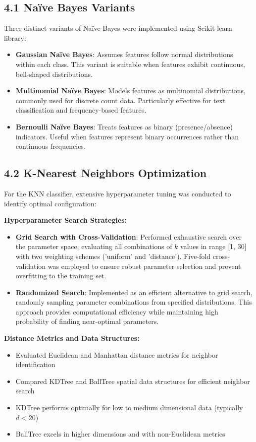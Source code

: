 \documentclass[11pt]{article}
\begin{document}
\subsection*{4.1 Na\"ive Bayes Variants}
Three distinct variants of Na\"ive Bayes were implemented using Scikit-learn library:
\begin{itemize}
    \item \textbf{Gaussian Na\"ive Bayes}: Assumes features follow normal distributions within each class. This variant is suitable when features exhibit continuous, bell-shaped distributions.
    
    \item \textbf{Multinomial Na\"ive Bayes}: Models features as multinomial distributions, commonly used for discrete count data. Particularly effective for text classification and frequency-based features.
    
    \item \textbf{Bernoulli Na\"ive Bayes}: Treats features as binary (presence/absence) indicators. Useful when features represent binary occurrences rather than continuous frequencies.
\end{itemize}

\subsection*{4.2 K-Nearest Neighbors Optimization}
For the KNN classifier, extensive hyperparameter tuning was conducted to identify optimal configuration:

\textbf{Hyperparameter Search Strategies:}
\begin{itemize}
    \item \textbf{Grid Search with Cross-Validation}: Performed exhaustive search over the parameter space, evaluating all combinations of $k$ values in range [1, 30] with two weighting schemes ('uniform' and 'distance'). Five-fold cross-validation was employed to ensure robust parameter selection and prevent overfitting to the training set.
    
    \item \textbf{Randomized Search}: Implemented as an efficient alternative to grid search, randomly sampling parameter combinations from specified distributions. This approach provides computational efficiency while maintaining high probability of finding near-optimal parameters.
\end{itemize}

\textbf{Distance Metrics and Data Structures:}
\begin{itemize}
    \item Evaluated Euclidean and Manhattan distance metrics for neighbor identification
    \item Compared KDTree and BallTree spatial data structures for efficient neighbor search
    \item KDTree performs optimally for low to medium dimensional data (typically $d < 20$)
    \item BallTree excels in higher dimensions and with non-Euclidean metrics
\end{itemize}
\end{document}

